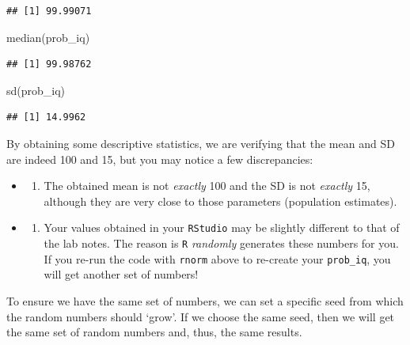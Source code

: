 \documentclass[
]{book}
\newenvironment{Shaded}{\begin{snugshade}}{\end{snugshade}}
\newcommand{\FunctionTok}[1]{\textcolor[rgb]{0.00,0.00,0.00}{#1}}
\newcommand{\NormalTok}[1]{#1}
\providecommand{\tightlist}{%
  \setlength{\itemsep}{0pt}\setlength{\parskip}{0pt}}
\begin{document}
\begin{verbatim}
## [1] 99.99071
\end{verbatim}

\begin{Shaded}
\begin{Highlighting}[]
\FunctionTok{median}\NormalTok{(prob\_iq) }
\end{Highlighting}
\end{Shaded}

\begin{verbatim}
## [1] 99.98762
\end{verbatim}

\begin{Shaded}
\begin{Highlighting}[]
\FunctionTok{sd}\NormalTok{(prob\_iq) }
\end{Highlighting}
\end{Shaded}

\begin{verbatim}
## [1] 14.9962
\end{verbatim}

By obtaining some descriptive statistics, we are verifying that the mean and SD are indeed 100 and 15, but you may notice a few discrepancies:

\begin{itemize}
\item
  \begin{enumerate}
  \def\labelenumi{\arabic{enumi}.}
  \tightlist
  \item
    The obtained mean is not \emph{exactly} 100 and the SD is not \emph{exactly} 15, although they are very close to those parameters (population estimates).
  \end{enumerate}
\item
  \begin{enumerate}
  \def\labelenumi{\arabic{enumi}.}
  \setcounter{enumi}{1}
  \tightlist
  \item
    Your values obtained in your \texttt{RStudio} may be slightly different to that of the lab notes. The reason is \texttt{R} \emph{randomly} generates these numbers for you. If you re-run the code with \texttt{rnorm} above to re-create your \texttt{prob\_iq}, you will get another set of numbers!
  \end{enumerate}
\end{itemize}

To ensure we have the same set of numbers, we can set a specific seed from which the random numbers should `grow'. If we choose the same seed, then we will get the same set of random numbers and, thus, the same results.
\end{document}

